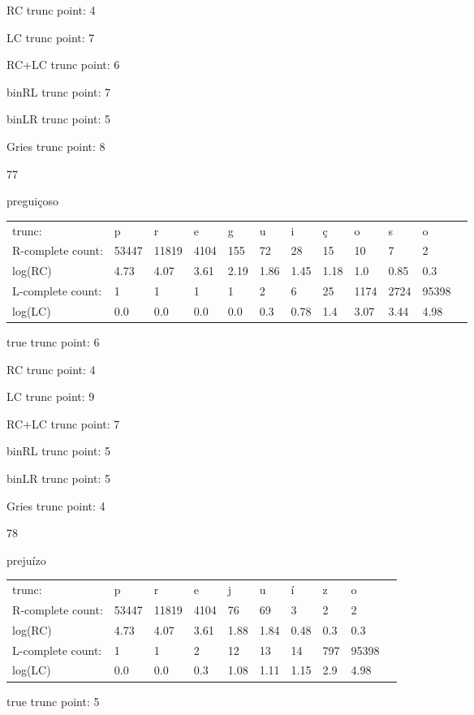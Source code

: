 \documentclass[10pt]{article}
\begin{document}
RC trunc point: 4

LC trunc point: 7

RC+LC trunc point: 6

binRL trunc point: 7

binLR trunc point: 5

Gries trunc point: 8

\newpage

77

preguiçoso

\begin{tabular}{l|lllllllllll}
trunc: & p & r & e & g & u & i & ç & o & s & o & \\ 
R-complete count: & 53447 & 11819 & 4104 & 155 & 72 & 28 & 15 & 10 & 7 & 2 & \\ 
log(RC) & 4.73 & 4.07 & 3.61 & 2.19 & 1.86 & 1.45 & 1.18 & 1.0 & 0.85 & 0.3 & \\ 
L-complete count: & 1 & 1 & 1 & 1 & 2 & 6 & 25 & 1174 & 2724 & 95398 & \\ 
log(LC) & 0.0 & 0.0 & 0.0 & 0.0 & 0.3 & 0.78 & 1.4 & 3.07 & 3.44 & 4.98 & \\ 
\end{tabular}

true trunc point: 6

RC trunc point: 4

LC trunc point: 9

RC+LC trunc point: 7

binRL trunc point: 5

binLR trunc point: 5

Gries trunc point: 4

\vspace{1em}

78

prejuízo

\begin{tabular}{l|lllllllll}
trunc: & p & r & e & j & u & í & z & o & \\ 
R-complete count: & 53447 & 11819 & 4104 & 76 & 69 & 3 & 2 & 2 & \\ 
log(RC) & 4.73 & 4.07 & 3.61 & 1.88 & 1.84 & 0.48 & 0.3 & 0.3 & \\ 
L-complete count: & 1 & 1 & 2 & 12 & 13 & 14 & 797 & 95398 & \\ 
log(LC) & 0.0 & 0.0 & 0.3 & 1.08 & 1.11 & 1.15 & 2.9 & 4.98 & \\ 
\end{tabular}

true trunc point: 5
\end{document}
